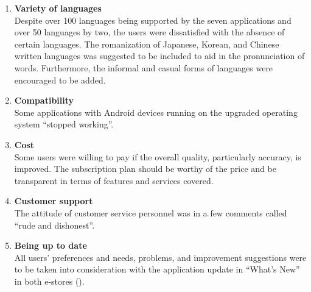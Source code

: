 \documentclass[english]{textolivre}
\begin{document}
\begin{enumerate}
\item \textbf{Variety of languages} \\
Despite over 100 languages being supported by the seven applications and over 50 languages by two, the users were dissatisfied with the absence of certain languages. The romanization of Japanese, Korean, and Chinese written languages was suggested to be included to aid in the pronunciation of words. Furthermore, the informal and casual forms of languages were encouraged to be added.

\item \textbf{Compatibility} \\
Some applications with Android devices running on the upgraded operating system “stopped working”.

\item \textbf{Cost} \\
Some users were willing to pay if the overall quality, particularly accuracy, is improved. The subscription plan should be worthy of the price and be transparent in terms of features and services covered.

\item \textbf{Customer support} \\
The attitude of customer service personnel was in a few comments called “rude and dishonest”.

\item \textbf{Being up to date} \\
All users’ preferences and needs, problems, and improvement suggestions were to be taken into consideration with the application update in “What’s New” in both e-stores ().  
\end{enumerate}
\end{document}
